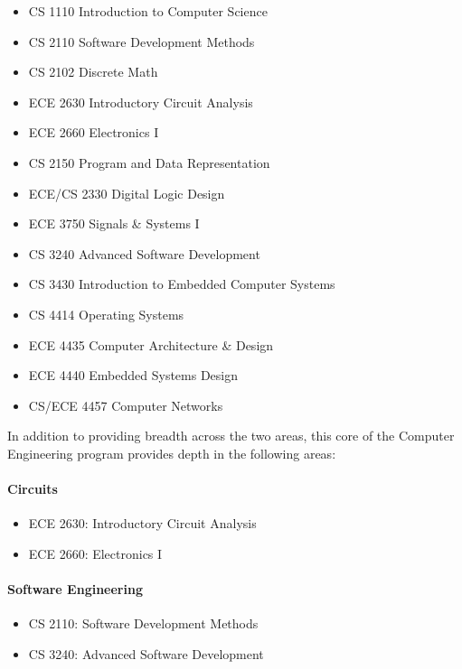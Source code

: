 \documentclass[10pt,letter,twocolumn]{book}
\newenvironment{itemlist}{
\begin{itemize}
\setlength{\itemsep}{0pt}
\setlength{\parskip}{0pt}}
{\end{itemize}}
\begin{document}
\begin{itemlist}
\item CS 1110 Introduction to Computer Science
\item CS 2110 Software Development Methods
\item CS 2102 Discrete Math
\item ECE 2630 Introductory Circuit Analysis
\item ECE 2660 Electronics I
\item CS 2150 Program and Data Representation
\item ECE/CS 2330 Digital Logic Design
\item ECE 3750 Signals \& Systems I
\item CS 3240 Advanced Software Development
\item CS 3430 Introduction to Embedded Computer Systems
\item CS 4414 Operating Systems
\item ECE 4435 Computer Architecture \& Design
\item ECE 4440 Embedded Systems Design
\item CS/ECE 4457 Computer Networks
\end{itemlist}


\noindent In addition to providing breadth across the two areas,
this core of the Computer Engineering program provides
depth in the following areas:


\paragraph{Circuits}
\begin{itemlist}
\item ECE 2630: Introductory Circuit Analysis
\item ECE 2660: Electronics I
\end{itemlist}

\paragraph{Software Engineering}
\begin{itemlist}
\item CS 2110: Software Development Methods
\item CS 3240: Advanced Software Development
\end{itemlist}
\end{document}
